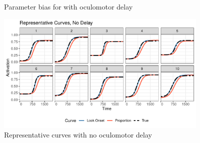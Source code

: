 \documentclass{article}
\begin{document}
\begin{figure}[H]
\centering
\caption{Parameter bias for with oculomotor delay}
\label{fig:par_bias_no_delay}
\end{figure}

\begin{figure}[H]
\centering
\includegraphics[width=0.9\textwidth]{rep_curves_no_delay.pdf}
\caption{Representative curves with no oculomotor delay}
\label{fig:rep_curves_no_delay}
\end{figure}
\end{document}

